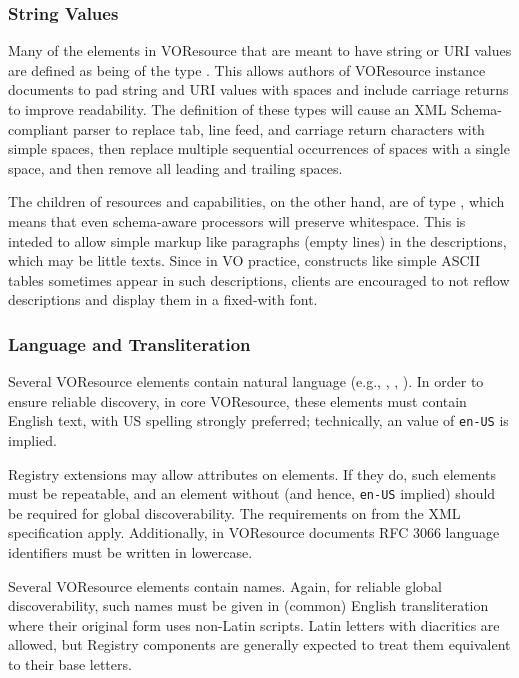 \documentclass[11pt,a4paper]{ivoa}
\begin{document}
\subsubsection{String Values}

Many of the elements in VOResource that are meant to have string or
URI values are defined as being of the type .
This allows authors of VOResource instance documents to pad string and
URI values with spaces and include carriage returns to improve
readability.  The definition of these types will cause an XML
Schema-compliant parser to replace tab, line feed, and carriage return
characters with simple spaces, then replace multiple sequential
occurrences of spaces with a single space, and then remove all leading
and trailing spaces.

The  children of resources and capabilities, on the
other hand, are of type , which means that even
schema-aware processors will preserve whitespace.  This is inteded to
allow simple markup like paragraphs (empty lines) in the descriptions,
which may be little texts.  Since in VO practice, constructs like simple
ASCII tables sometimes appear in such descriptions, clients are
encouraged to not reflow descriptions and display them in a fixed-with
font.

\subsubsection{Language and Transliteration}

Several VOResource elements contain natural language (e.g.,
, , ).  In order to
ensure reliable discovery, in core VOResource, these elements must
contain English text, with US spelling strongly preferred; technically,
an  value of \texttt{en-US} is implied.

Registry extensions may allow  attributes on elements.
If they do, such elements must be repeatable, and an element without
 (and hence, \texttt{en-US} implied) should be required
for global discoverability.  The requirements on  from
the XML specification \citep{std:XML} apply.  Additionally, in
VOResource documents RFC 3066 language identifiers must be written in
lowercase.

Several VOResource elements contain names.  Again, for reliable global
discoverability, such names must be given in (common) English
transliteration where their original form uses non-Latin scripts.
Latin letters with diacritics are allowed, but Registry components are
generally expected to treat them equivalent to their base letters.
\end{document}
